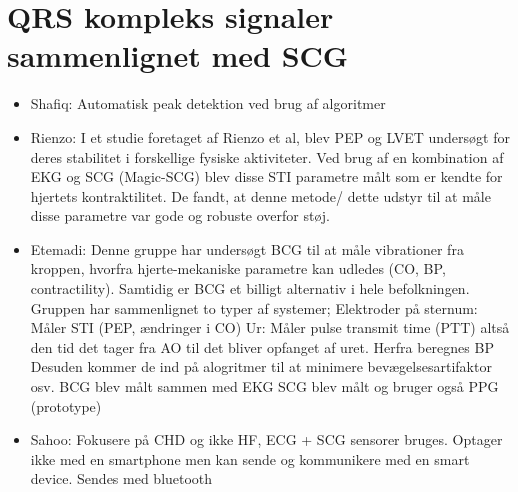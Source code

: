 

\section{QRS kompleks signaler sammenlignet med SCG }




\begin{itemize}
\item Shafiq: Automatisk peak detektion ved brug af algoritmer 
\item Rienzo: I et studie foretaget af Rienzo et al, blev PEP og LVET undersøgt for deres stabilitet i forskellige fysiske aktiviteter. Ved brug af en kombination af EKG og SCG (Magic-SCG) blev disse STI parametre målt som er kendte for hjertets kontraktilitet. De fandt, at denne metode/ dette udstyr til at måle disse parametre var gode og robuste overfor støj.
\item Etemadi: Denne gruppe har undersøgt BCG til at måle vibrationer fra kroppen, hvorfra hjerte-mekaniske parametre kan udledes (CO, BP, contractility). Samtidig er BCG et billigt alternativ i hele befolkningen.
Gruppen har sammenlignet to typer af systemer; Elektroder på sternum: Måler STI (PEP, ændringer i CO) Ur: Måler pulse transmit time (PTT)  altså den tid det tager fra AO til det bliver opfanget af uret. Herfra beregnes BP
Desuden kommer de ind på alogritmer til at minimere bevægelsesartifaktor osv.
BCG blev målt sammen med EKG
SCG blev målt og bruger også PPG (prototype)
\item Sahoo: Fokusere på CHD og ikke HF, ECG + SCG sensorer bruges. Optager ikke med en smartphone men kan sende og kommunikere med en smart device. Sendes med bluetooth
\end{itemize}